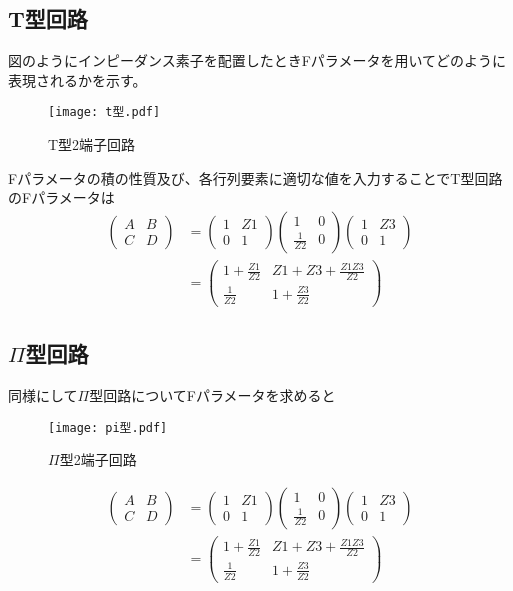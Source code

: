 \subsection{T型回路}
図のようにインピーダンス素子を配置したときFパラメータを用いてどのように表現されるかを示す。
\begin{figure}[H]
    \centering
    \texttt{[image: t型.pdf]}
    \caption{T型2端子回路}
\end{figure}
Fパラメータの積の性質及び、各行列要素に適切な値を入力することでT型回路のFパラメータは
\begin{eqnarray}
    \begin{pmatrix}A&B\\C&D\end{pmatrix} &= \begin{pmatrix}1&Z1\\0&1\end{pmatrix}\begin{pmatrix}1&0\\\frac{1}{Z2}&0\end{pmatrix}\begin{pmatrix}1&Z3\\0&1\end{pmatrix}\\
    &=\begin{pmatrix}1+\frac{Z1}{Z2}&Z1+Z3+\frac{Z1Z3}{Z2}\\\frac{1}{Z2}&1+\frac{Z3}{Z2}\end{pmatrix}
\end{eqnarray}
\subsection{$\Pi$型回路}
同様にして$\Pi$型回路についてFパラメータを求めると
\begin{figure}[H]
    \centering
    \texttt{[image: pi型.pdf]}
    \caption{$\Pi$型2端子回路}
\end{figure}
\begin{eqnarray}
    \begin{pmatrix}A&B\\C&D\end{pmatrix} &= \begin{pmatrix}1&Z1\\0&1\end{pmatrix}\begin{pmatrix}1&0\\\frac{1}{Z2}&0\end{pmatrix}\begin{pmatrix}1&Z3\\0&1\end{pmatrix}\\
    &=\begin{pmatrix}1+\frac{Z1}{Z2}&Z1+Z3+\frac{Z1Z3}{Z2}\\\frac{1}{Z2}&1+\frac{Z3}{Z2}\end{pmatrix}
\end{eqnarray}
